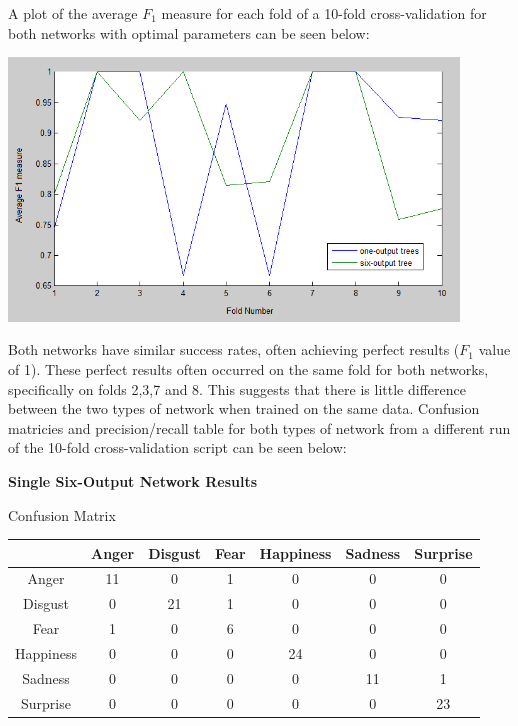 \documentclass[a4paper]{article}
\begin{document}
A plot of the average $F_1$ measure for each fold of a 10-fold cross-validation for both networks with optimal parameters can be seen below:
\begin{center}
\includegraphics[height=70mm]{10-fold-plot.png}
\end{center}
\begin{flushleft}
Both networks have similar success rates, often achieving perfect results ($F_1$ value of 1). These perfect results often occurred on the same
fold for both networks, specifically on folds 2,3,7 and 8. This suggests that there is little difference between the two types of network when
trained on the same data. Confusion matricies and precision/recall table for both types of network from a different run of the 
10-fold cross-validation script can be seen below:\\
\end{flushleft}


{\bf Single Six-Output Network Results}

 \begin{center}
	
	Confusion Matrix\\
	
  \begin{tabular}{c|cccccc}
    & Anger & Disgust & Fear & Happiness & Sadness & Surprise \\
    \hline
    Anger & 11 & 0 & 1 & 0 & 0 & 0 \\
  Disgust & 0 & 21 & 1 & 0 & 0 & 0 \\
     Fear & 1 & 0 & 6 & 0 & 0 & 0 \\
Happiness & 0 & 0 & 0 & 24 & 0 & 0 \\
  Sadness & 0 & 0 & 0 & 0 & 11 & 1 \\
 Surprise & 0 & 0 & 0 & 0 & 0 & 23 \\
  \end{tabular}\\
  \end{center}
  
\end{document}
